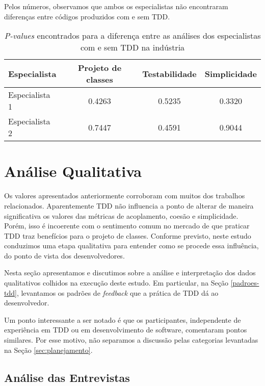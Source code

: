 \documentclass[conference]{IEEEtran}
\begin{document}
Pelos números, observamos que ambos os especialistas não encontraram diferenças 
entre códigos produzidos com e sem TDD. 

\begin{table}[h!]
	\centering
	\begin{tabular}{| p{2cm} | c | c | c | }
		\hline
		\textbf{Especialista} & \textbf{Projeto de classes} & \textbf{Testabilidade} & \textbf{Simplicidade}\\
		\hline
		Especialista 1 &	0.4263 &	0.5235 &	0.3320\\
		Especialista 2 &	0.7447 &	0.4591 &	0.9044\\
		\hline
	\end{tabular}
	\caption{\textit{P-values} encontrados para a diferença entre as análises dos especialistas com e sem TDD na indústria}
	\label{tab:especialistas-industria}
\end{table}

\section{Análise Qualitativa}

Os valores apresentados anteriormente corroboram com muitos dos trabalhos relacionados. 
Aparentemente TDD não influencia a ponto de alterar 
de maneira significativa os valores das métricas de acoplamento, coesão e simplicidade.
Porém, isso é incoerente com o sentimento comum no mercado de que praticar TDD
traz benefícios para o projeto de classes. Conforme previsto, neste estudo conduzimos
uma etapa qualitativa para entender como se procede essa influência, do ponto
de vista dos desenvolvedores.

Nesta seção apresentamos e discutimos sobre a análise e interpretação dos dados qualitativos colhidos
na execução deste estudo. Em particular, na Seção 
\ref{padroes-tdd}, levantamos os padrões de \textit{feedback} que a prática de TDD
dá ao desenvolvedor.

Um ponto interessante a ser notado é que os participantes, independente de experiência
em TDD ou em desenvolvimento de software, comentaram pontos similares. Por esse motivo,
não separamos a discussão pelas categorias levantadas na Seção \ref{sec:planejamento}.

\subsection{Análise das Entrevistas}
\end{document}
